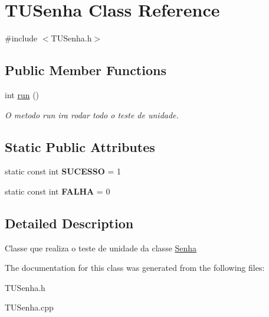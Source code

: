 \hypertarget{classTUSenha}{}\section{T\+U\+Senha Class Reference}
\label{classTUSenha}


{\ttfamily \#include $<$T\+U\+Senha.\+h$>$}

\subsection*{Public Member Functions}
\begin{DoxyCompactItemize}
\item 
int \hyperlink{classTUSenha_ac5ddea52ed42b828961f343b82074125}{run} ()\hypertarget{classTUSenha_ac5ddea52ed42b828961f343b82074125}{}\label{classTUSenha_ac5ddea52ed42b828961f343b82074125}

\begin{DoxyCompactList}\small\item\em O metodo run ira rodar todo o teste de unidade. \end{DoxyCompactList}\end{DoxyCompactItemize}
\subsection*{Static Public Attributes}
\begin{DoxyCompactItemize}
\item 
static const int {\bfseries S\+U\+C\+E\+S\+SO} = 1\hypertarget{classTUSenha_a1a1dabe034b25a899150c95acbc0684c}{}\label{classTUSenha_a1a1dabe034b25a899150c95acbc0684c}

\item 
static const int {\bfseries F\+A\+L\+HA} = 0\hypertarget{classTUSenha_a71eb0d9005b2d36da6a8530c0dd31842}{}\label{classTUSenha_a71eb0d9005b2d36da6a8530c0dd31842}

\end{DoxyCompactItemize}


\subsection{Detailed Description}
Classe que realiza o teste de unidade da classe \hyperlink{classSenha}{Senha} 

The documentation for this class was generated from the following files\+:\begin{DoxyCompactItemize}
\item 
T\+U\+Senha.\+h\item 
T\+U\+Senha.\+cpp\end{DoxyCompactItemize}
